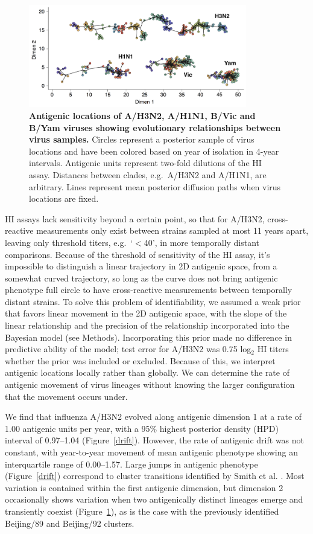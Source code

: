\documentclass[11pt,oneside,letterpaper]{article}
\begin{document}
\begin{figure}[h]
	\centering		
	\includegraphics[width=0.85\textwidth]{figures/map}
	\caption{\textbf{Antigenic locations of A/H3N2, A/H1N1, B/Vic and B/Yam viruses showing evolutionary relationships between virus samples.} 
	Circles represent a posterior sample of virus locations and have been colored based on year of isolation in 4-year intervals.
	Antigenic units represent two-fold dilutions of the HI assay.
	Distances between clades, e.g.\ A/H3N2 and A/H1N1, are arbitrary.
	Lines represent mean posterior diffusion paths when virus locations are fixed.} 
	\label{map} 
\end{figure}

HI assays lack sensitivity beyond a certain point, so that for A/H3N2, cross-reactive measurements only exist between strains sampled at most 11 years apart, leaving only threshold titers, e.g.\ `$<$40', in more temporally distant comparisons.  
Because of the threshold of sensitivity of the HI assay, it's impossible to distinguish a linear trajectory in 2D antigenic space, from a somewhat curved trajectory, so long as the curve does not bring antigenic phenotype full circle to have cross-reactive measurements between temporally distant strains.
To solve this problem of identifiability, we assumed a weak prior that favors linear movement in the 2D antigenic space, with the slope of the linear relationship and the precision of the relationship incorporated into the Bayesian model (see Methods).
Incorporating this prior made no difference in predictive ability of the model; test error for A/H3N2 was 0.75 log$_2$ HI titers whether the prior was included or excluded.
Because of this, we interpret antigenic locations locally rather than globally.
We can determine the rate of antigenic movement of virus lineages without knowing the larger configuration that the movement occurs under.
 
We find that influenza A/H3N2 evolved along antigenic dimension 1 at a rate of 1.00 antigenic units per year, with a 95\% highest posterior density (HPD) interval of 0.97--1.04 (Figure~\ref{drift}).
However, the rate of antigenic drift was not constant, with year-to-year movement of mean antigenic phenotype showing an interquartile range of 0.00--1.57.  
Large jumps in antigenic phenotype (Figure~\ref{drift}) correspond to cluster transitions identified by Smith et al. \cite{Smith04}.  
Most variation is contained within the first antigenic dimension, but dimension 2 occasionally shows variation when two antigenically distinct lineages emerge and transiently coexist (Figure~\ref{map}), as is the case with the previously identified Beijing/89 and Beijing/92 clusters.
\end{document}
